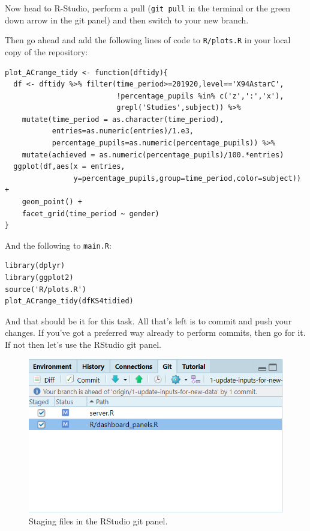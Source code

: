 \documentclass[
  12pt,
]{article}
\begin{document}
Now head to R-Studio, perform a pull (\texttt{git\ pull} in the terminal
or the green down arrow in the git panel) and then switch to your new
branch.

Then go ahead and add the following lines of code to \texttt{R/plots.R}
in your local copy of the repository:

\begin{verbatim}
plot_ACrange_tidy <- function(dftidy){
  df <- dftidy %>% filter(time_period>=201920,level=='X94AstarC',
                          !percentage_pupils %in% c('z',':','x'),
                          grepl('Studies',subject)) %>%
    mutate(time_period = as.character(time_period),
           entries=as.numeric(entries)/1.e3,
           percentage_pupils=as.numeric(percentage_pupils)) %>%
    mutate(achieved = as.numeric(percentage_pupils)/100.*entries)
  ggplot(df,aes(x = entries,
                y=percentage_pupils,group=time_period,color=subject)) +
    geom_point() +
    facet_grid(time_period ~ gender)
}
\end{verbatim}

And the following to \texttt{main.R}:

\begin{verbatim}
library(dplyr)
library(ggplot2)
source('R/plots.R')
plot_ACrange_tidy(dfKS4tidied)
\end{verbatim}

And that should be it for this task. All that's left is to commit and
push your changes. If you've got a preferred way already to perform
commits, then go for it. If not then let's use the RStudio git panel.

\begin{figure}

{\centering \includegraphics[width=0.64\linewidth]{images/gitdemo/gitdemo-RStudio-gitpanel} 

}

\caption{Staging files in the RStudio git panel.}\label{fig:unnamed-chunk-16}
\end{figure}
\end{document}
